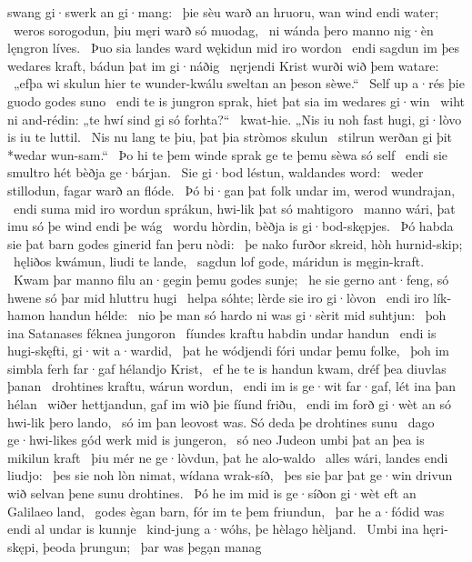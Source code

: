 swang gi·swerk an gi·mang: \hld\ þie sèu warð an hruoru,
wan wind endi water; \hld\ weros sorogodun,
þiu męri warð só muodag, \hld\ ni wánda þero manno nig·èn
lęngron líves. \hld\ Þuo sia landes ward
wękidun mid iro wordon \hld\ endi sagdun im þes wedares kraft,
bádun þat im gi·náðig \hld\ nęrjendi Krist
wurði wið þem watare: \hld\ „efþa wi skulun hier te wunder-kwálu
sweltan an þeson sèwe.“ \hld\ Self up a·rés
þie guodo godes suno \hld\ endi te is jungron sprak,
hiet þat sia im wedares gi·win \hld\ wiht ni and-rédin:
„te hwí sind gi só forhta?“ \hld\ kwat-hie. „Nis iu noh fast hugi,
gi·lòvo is iu te luttil. \hld\ Nis nu lang te þiu,
þat þia stròmos skulun \hld\ stilrun werðan
gi þit *wedar wun-sam.“ \hld\ Þo hi te þem winde sprak
ge te þemu sèwa só self \hld\ endi sie smultro hét
bèðja ge·bárjan. \hld\ Sie gi·bod léstun,
waldandes word: \hld\ weder stillodun,
fagar warð an flóde. \hld\ Þó bi·gan þat folk undar im,
werod wundrajan, \hld\ endi suma mid iro wordun sprákun,
hwi-lik þat só mahtigoro \hld\ manno wári,
þat imu só þe wind endi þe wág \hld\ wordu hòrdin,
bèðja is gi·bod-skępjes. \hld\ Þó habda sie þat barn godes
ginerid fan þeru nòdi: \hld\ þe nako furðor skreid,
hòh hurnid-skip; \hld\ hęliðos kwámun,
liudi te lande, \hld\ sagdun lof gode,
máridun is męgin-kraft. \hld\ Kwam þar manno filu
an·gegin þemu godes sunje; \hld\ he sie gerno ant·feng,
só hwene só þar mid hluttru hugi \hld\ helpa sóhte;
lèrde sie iro gi·lòvon \hld\ endi iro lík-hamon
handun hélde: \hld\ nio þe man só hardo ni was
gi·sèrit mid suhtjun: \hld\ þoh ina Satanases
féknea jungoron \hld\ fíundes kraftu
habdin undar handun \hld\ endi is hugi-skęfti,
gi·wit a·wardid, \hld\ þat he wódjendi
fóri undar þemu folke, \hld\ þoh im simbla ferh far·gaf
hélandjo Krist, \hld\ ef he te is handun kwam,
dréf þea diuvlas þanan \hld\ drohtines kraftu,
wárun wordun, \hld\ endi im is ge·wit far·gaf,
lét ina þan hélan \hld\ wiðer hettjandun,
gaf im wið þie fíund friðu, \hld\ endi im forð gi·wèt
an só hwi-lik þero lando, \hld\ só im þan leovost was.
Só deda þe drohtines sunu \hld\ dago ge·hwi-likes
gód werk mid is jungeron, \hld\ só neo Judeon umbi þat
an þea is mikilun kraft \hld\ þiu mér ne ge·lòvdun,
þat he alo-waldo \hld\ alles wári,
landes endi liudjo: \hld\ þes sie noh lòn nimat,
wídana wrak-síð, \hld\ þes sie þar þat ge·win drivun
wið selvan þene sunu drohtines. \hld\ Þó he im mid is ge·síðon gi·wèt
eft an Galilaeo land, \hld\ godes ègan barn,
fór im te þem friundun, \hld\ þar he a·fódid was
endi al undar is kunnje \hld\ kind-jung a·wóhs,
þe hèlago hèljand. \hld\ Umbi ina hęri-skępi,
þeoda þrungun; \hld\ þar was þegạn manag
